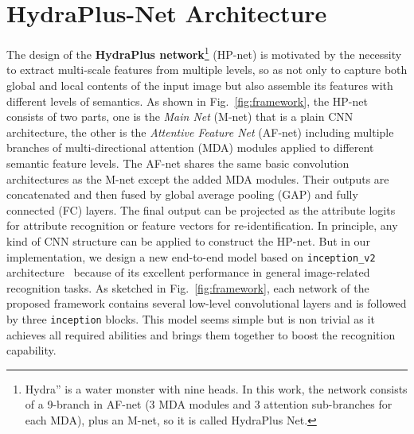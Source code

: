 \documentclass[10pt,twocolumn,letterpaper]{article}
\begin{document}
\section{HydraPlus-Net Architecture}
\label{sec:multi_attention}
\vspace{-0.1cm}
%
The design of the \textbf{HydraPlus network}\footnote{Hydra” is a water monster with nine heads. In this work, the network consists of a 9-branch in AF-net (3 MDA modules and 3 attention sub-branches for each MDA), plus an M-net, so it is called HydraPlus Net.} (HP-net) is motivated by the necessity to extract multi-scale features from multiple levels, so as not only to capture both global and local contents of the input image but also assemble its features with different levels of semantics.
%
%
%
As shown in Fig.~\ref{fig:framework}, the HP-net consists of two parts, one is the \textit{Main Net} (M-net) that is a plain CNN architecture, the other is the \textit{Attentive Feature Net} (AF-net) including multiple branches of multi-directional attention (MDA) modules applied to different semantic feature levels.
%
The AF-net shares the same basic convolution architectures as the M-net except the added MDA modules.
%
Their outputs are concatenated and then fused by global average pooling (GAP) and fully connected (FC) layers. The final output can be projected as the attribute logits for attribute recognition or feature vectors for re-identification.
%
In principle, any kind of CNN structure can be applied to construct the HP-net.
%
But in our implementation, we design a new end-to-end model based on \texttt{inception\_v2} architecture~\cite{ioffe2015batch} because of its excellent performance in general image-related recognition tasks.
%
As sketched in Fig.~\ref{fig:framework}, each network of the proposed framework contains several low-level convolutional layers and is followed by three \texttt{inception} blocks.
%
%
This model seems simple but is non trivial as it achieves all required abilities and brings them together to boost the recognition capability.
\end{document}
